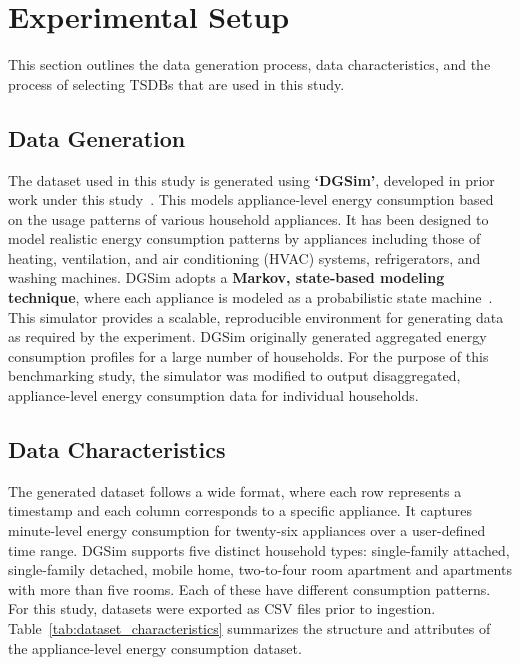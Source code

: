 \documentclass[conference]{IEEEtran}
\begin{document}
\section{Experimental Setup}\label{sec:setup}
This section outlines the data generation process, data characteristics, and the process of selecting TSDBs that are used in this study.
\subsection{Data Generation}
The dataset used in this study is generated using \textbf{`DGSim'}, developed in prior work under this study~\cite{17_DGSim}. This models appliance-level energy consumption based on the usage patterns of various household appliances. It has been designed to model realistic energy consumption patterns by appliances including those of heating, ventilation, and air conditioning (HVAC) systems, refrigerators, and washing machines. DGSim adopts a \textbf{Markov, state-based modeling technique}, where each appliance is modeled as a probabilistic state machine~\cite{12_zucchini2016hmm}. This simulator provides a scalable, reproducible environment for generating data as required by the experiment. 
DGSim originally generated aggregated energy consumption profiles for a large number of households. For the purpose of this benchmarking study, the simulator was modified to output disaggregated, appliance-level energy consumption data for individual households.

\subsection{Data Characteristics}
The generated dataset follows a wide format, where each row represents a timestamp and each column corresponds to a specific appliance. It captures minute-level energy consumption for twenty-six appliances over a user-defined time range. DGSim supports five distinct household types: single-family attached, single-family detached, mobile home, two-to-four room apartment and apartments with more than five rooms. Each of these have different consumption patterns.
For this study, datasets were exported as CSV files prior to ingestion. Table~\ref{tab:dataset_characteristics} summarizes the structure and attributes of the appliance-level energy consumption dataset.
\end{document}
